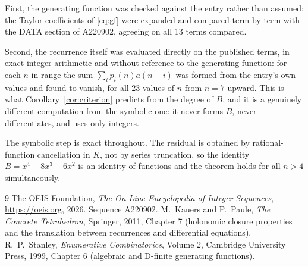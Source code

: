 \documentclass[11pt,a4paper]{article}
\theoremstyle{plain}
\theoremstyle{definition}
\begin{document}
First, the generating function was checked against the entry rather than assumed: the
Taylor coefficients of \eqref{eq:gf} were expanded and compared term by term with the DATA
section of A220902, agreeing on all 13 terms compared.

Second, the recurrence itself was evaluated directly on the published terms, in exact
integer arithmetic and without reference to the generating function: for each $n$ in range
the sum $\sum_{i}p_{i}(n)a(n-i)$ was formed from the entry's own values and found to
vanish, for all 23 values of $n$ from $n=7$ upward. This is what
Corollary~\ref{cor:criterion} predicts from the degree of $B$, and it is a genuinely
different computation from the symbolic one: it never forms $B$, never differentiates, and
uses only integers.

The symbolic step is exact throughout. The residual is obtained by rational-function
cancellation in $K$, not by series truncation, so the identity $B=x^{4} - 8 x^{3} + 6 x^{2}$ is an
identity of functions and the theorem holds for all $n>4$ simultaneously.

\begin{thebibliography}{9}
 The OEIS Foundation, \emph{The On-Line Encyclopedia of Integer Sequences},
\url{https://oeis.org}, 2026. Sequence A220902.
 M.~Kauers and P.~Paule, \emph{The Concrete Tetrahedron}, Springer, 2011,
Chapter 7 (holonomic closure properties and the translation between recurrences and
differential equations).
 R.~P.~Stanley, \emph{Enumerative Combinatorics}, Volume 2, Cambridge
University Press, 1999, Chapter 6 (algebraic and D-finite generating functions).
\end{thebibliography}
\end{document}

